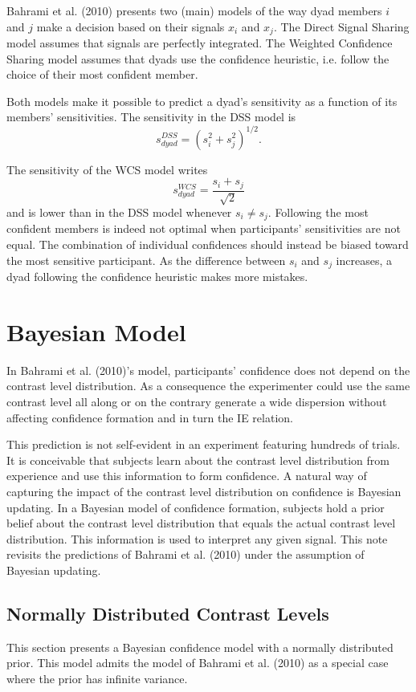 \documentclass[12pt]{article}
\begin{document}
Bahrami et al. (2010) presents two (main) models of the way dyad members $i$ and $j$ make a decision based on their signals $x_i$ and $x_j$. The Direct Signal Sharing model assumes that signals are perfectly integrated. The Weighted Confidence Sharing model assumes that dyads use the confidence heuristic, i.e. follow the choice of their most confident member. 

Both models make it possible to predict a dyad's sensitivity as a function of its members' sensitivities. The sensitivity in the DSS model is $$ s_{dyad}^{DSS} = (s_i^2+s_j^2)^{1/2}. $$

The sensitivity of the WCS model writes $$s_{dyad}^{WCS} = \frac{s_i+s_j}{\sqrt{2}}$$ and is lower than in the DSS model whenever $s_i \neq s_j$. Following the most confident members is indeed not optimal when participants' sensitivities are not equal. The combination of individual confidences should instead be biased toward the most sensitive participant. As the difference between $s_i$ and $s_j$ increases, a dyad following the confidence heuristic makes more mistakes.

\section{Bayesian Model}
In Bahrami et al. (2010)'s model, participants' confidence does not depend on the contrast level distribution. As a consequence the experimenter could use the same contrast level all along or on the contrary generate a wide dispersion without affecting confidence formation and in turn the IE relation. 

This prediction is not self-evident in an experiment featuring hundreds of trials. It is conceivable that subjects learn about the contrast level distribution from experience and use this information to form confidence. A natural way of capturing the impact of the contrast level distribution on confidence is Bayesian updating. In a Bayesian model of confidence formation, subjects hold a prior belief about the contrast level distribution that equals the actual contrast level distribution. This information is used to interpret any given signal. This note revisits the predictions of Bahrami et al. (2010) under the assumption of Bayesian updating. 
 
\subsection{Normally Distributed Contrast Levels}
This section presents a Bayesian confidence model with a normally distributed prior. This model admits the model of Bahrami et al. (2010) as a special case where the prior has infinite variance. 
\end{document}
